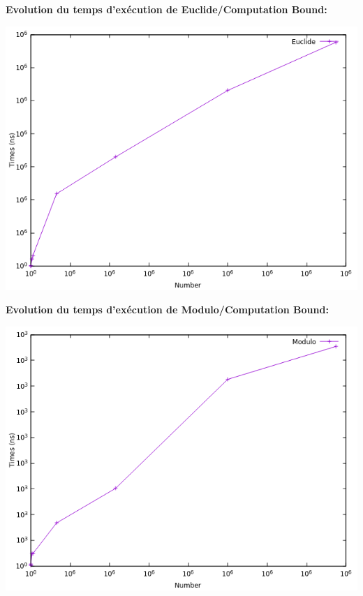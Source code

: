 		\begin{frame}
		\textbf{Evolution du temps d'exécution de Euclide/Computation Bound: }
		\begin{center}\includegraphics[scale=0.6]{euclide.png}\end{center}
		\end{frame}
		
		\begin{frame}
		\textbf{Evolution du temps d'exécution de Modulo/Computation Bound: }
		\begin{center}\includegraphics[scale=0.6]{modulo.png}\end{center}
		\end{frame}
		
